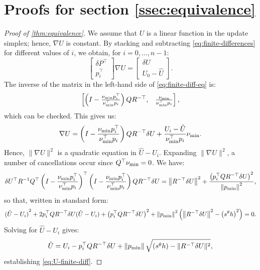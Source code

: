\documentclass[sisc-eikonal.tex]{subfiles}
\begin{document}
\section{Proofs for section
  \ref{ssec:equivalence}}\label{sec:equivalence-proofs}

\begin{proof}[Proof of \cref{thm:equivalence}]
  We assume that $U$ is a linear function in the update simplex;
  hence, $\nabla U$ is constant. By stacking and subtracting
  \cref{eq:finite-differences} for different values of $i$, we obtain,
  for $i = 0, \hdots, n - 1$:
  \begin{equation}\label{eq:finite-diff-eq}
    \begin{bmatrix}
      \delta P^\top \\
      p_i^\top
    \end{bmatrix} \nabla U = \begin{bmatrix}
      \delta U \\
      U_0 - \hat{U}
    \end{bmatrix}.
  \end{equation}
  The inverse of the matrix in the left-hand side of \cref{eq:finite-diff-eq} is:
  \begin{equation}
    \begin{bmatrix}
      \left(I - \frac{\nu_{\operatorname{min}} p_i^\top}{\nu_{\operatorname{min}}^\top p_i}\right) Q R^{-\top}, &
      \frac{\nu_{\operatorname{min}}}{\nu_{\operatorname{min}}^\top p_i}
    \end{bmatrix},
  \end{equation}
  which can be checked. This gives us:
  \begin{equation}
    \nabla U = \left(I - \frac{\nu_{\operatorname{min}} p_i^\top}{\nu_{\operatorname{min}}^\top p_i}\right) Q R^{-\top} \delta U + \frac{U_i - \hat{U}}{\nu_{\operatorname{min}}^\top p_i} \nu_{\operatorname{min}}.
  \end{equation}
  Hence, $\|\nabla U\|^2$ is a quadratic equation in
  $\hat{U} - U_i$. Expanding $\|\nabla U\|^2$, a number of
  cancellations occur since $Q^\top \nu_{\operatorname{min}} = 0$. We have:
  \begin{equation}
    \delta U^\top R^{-1} Q^\top \left(I - \frac{\nu_{\operatorname{min}} p_i^\top}{\nu_{\operatorname{min}}^\top p_i}\right)^\top \left(I - \frac{\nu_{\operatorname{min}} p_i^\top}{\nu_{\operatorname{min}}^\top p_i}\right) Q R^{-\top} \delta U = \left\|R^{-\top} \delta U\right\|^2 + \frac{\left(p_i^\top Q R^{-\top} \delta U\right)^2}{\left\|p_{\operatorname{min}}\right\|^2},
  \end{equation}
  so that, written in standard form:
  \begin{equation}
    {(\hat{U} - U_i)}^2 + 2 p_i^\top Q R^{-\top} \delta U {(\hat{U} - U_i)} + \left(p_i^\top Q R^{-\top} \delta U\right)^2 + \left\|p_{\operatorname{min}}\right\|^2 \left(\left\|R^{-\top} \delta U\right\|^2 - \left(s^\theta h\right)^2\right) = 0.
  \end{equation}
  Solving for $\hat{U} - U_i$ gives:
  \begin{equation}
    \hat{U} = U_i - p_i^\top Q R^{-\top} \delta U + \left\|p_{\operatorname{min}}\right\| \sqrt{\left(s^\theta h\right) - \|R^{-\top} \delta U\|^2},
  \end{equation}
  establishing \cref{eq:U-finite-diff}.


\end{proof}
\end{document}
